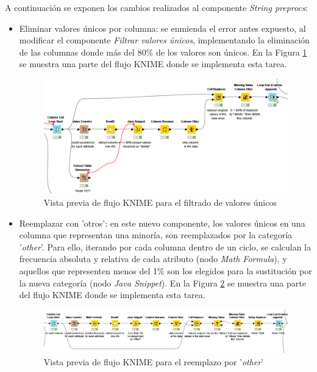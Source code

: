 A continuación se exponen los cambios realizados al componente \textit{String preprocs}:
\begin{itemize}

	\item Eliminar valores únicos por columna: se enmienda el error antes expuesto, al modificar el componente \textit{Filtrar valores únicos}, implementando la eliminación de las columnas donde más del 80\% de los valores son únicos. En la Figura \ref{fig:filtrar-valores-unicos-flujo} se muestra una parte del flujo KNIME donde se implementa esta tarea. 

	\begin{figure}[H]
		\centering
		\includegraphics[width=0.9\linewidth]{"figuras/capi 2/preprocesado/filtrar-valores-unicos-flujo"}
		\caption{Vista previa de flujo KNIME para el filtrado de valores únicos}
		\label{fig:filtrar-valores-unicos-flujo}
	\end{figure}

	\item Reemplazar con 'otros': en este nuevo componente, los valores únicos en una columna que representan una minoría, son reemplazados por la categoría '\textit{other}'.  Para ello, iterando por cada columna dentro de un ciclo, se calculan la frecuencia absoluta y relativa de cada atributo (nodo \textit{Math Formula}), y aquellos que representen menos del 1\% son los elegidos para la sustitución por la nueva categoría (nodo \textit{Java Snippet}). En la Figura \ref{fig:flujo-reemplazar-others} se muestra una parte del flujo KNIME donde se implementa esta tarea. 

	\begin{figure}[H]
		\centering
		\includegraphics[width=1\linewidth]{"figuras/capi 2/preprocesado/flujo-reemplazar-others"}
		\caption{Vista previa de flujo KNIME para el reemplazo por '\textit{other}'}
		\label{fig:flujo-reemplazar-others}
	\end{figure}

	
\end{itemize}


